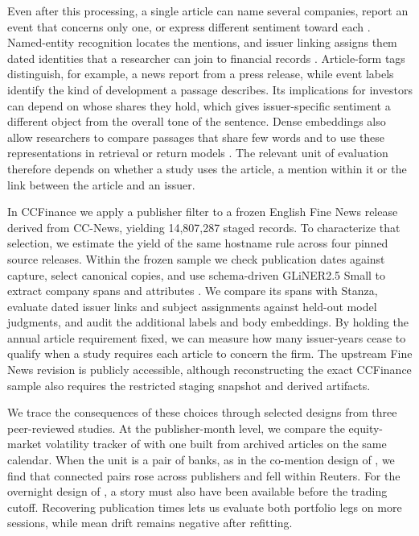 Even after this processing, a single article can name several companies,
report an event that concerns only one, or express different sentiment
toward each \citep{shah2024,sinha2022sentfin}. Named-entity recognition
locates the mentions, and issuer linking assigns them dated identities
that a researcher can join to financial records \citep{schwenkler2020}.
Article-form tags distinguish, for example, a news report from a press
release, while event labels identify the kind of development a passage
describes. Its implications for investors can depend on whose shares
they hold, which gives issuer-specific sentiment a different object
from the overall tone of the sentence. Dense embeddings also allow
researchers to compare passages that share few words and to use these
representations in retrieval or return models
\citep{lopez2025v6,embeddinggemma2025}. The relevant unit of evaluation
therefore depends on whether a study uses the article, a mention within
it or the link between the article and an issuer.

In CCFinance we apply a publisher filter to a frozen English Fine News
release derived from CC-News, yielding 14,807,287 staged records.
To characterize that selection, we estimate the yield of the same
hostname rule across four pinned source releases. Within the frozen
sample we check publication dates against capture, select canonical
copies, and use schema-driven GLiNER2.5 Small to extract company spans
and attributes \citep{gliner25}. We compare its spans with Stanza,
evaluate dated issuer links and subject assignments against held-out
model judgments, and audit the additional labels and body embeddings.
By holding the annual article requirement fixed, we can measure how
many issuer-years cease to qualify when a study requires each article
to concern the firm. The upstream Fine News revision is publicly
accessible, although reconstructing the exact CCFinance sample also
requires the restricted staging snapshot and derived artifacts.

We trace the consequences of these choices through selected designs
from three peer-reviewed studies. At the publisher-month level, we
compare the equity-market volatility tracker of \citet{baker2026} with
one built from archived articles on the same calendar. When the unit is
a pair of banks, as in the co-mention design of \citet{kazinnik2026},
we find that connected pairs rose across publishers and fell within
Reuters. For the overnight design of \citet{lopez2026}, a
story must also have been available before the trading cutoff.
Recovering publication times lets us evaluate both portfolio legs on
more sessions, while mean drift remains negative after refitting.
